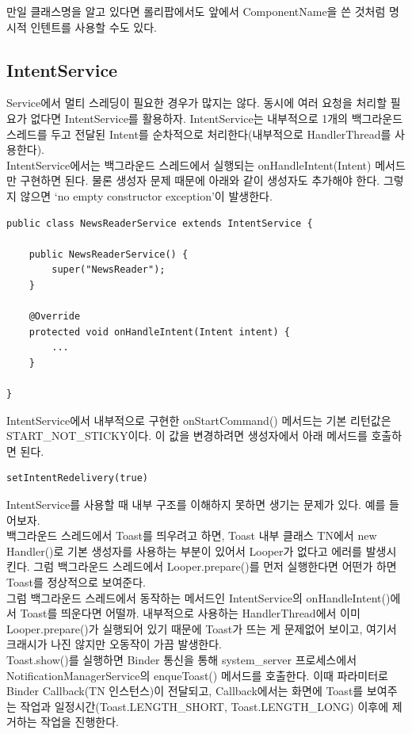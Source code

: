 만일 클래스명을 알고 있다면 롤리팝에서도 앞에서 ComponentName을 쓴 것처럼 명시적 인텐트를 사용할 수도 있다.

\subsection{IntentService}
Service에서 멀티 스레딩이 필요한 경우가 많지는 않다. 동시에 여러 요청을 처리할 필요가 없다면 IntentService를 활용하자.
IntentService는 내부적으로 1개의 백그라운드 스레드를 두고 전달된 Intent를 순차적으로 처리한다(내부적으로 HandlerThread를 사용한다).\\

IntentService에서는 백그라운드 스레드에서 실행되는 onHandleIntent(Intent) 메서드만 구현하면 된다.
물론 생성자 문제 때문에 아래와 같이 생성자도 추가해야 한다. 그렇지 않으면 `no empty constructor exception'이 발생한다. 
\begin{lstlisting}[frame=single]
public class NewsReaderService extends IntentService {

	public NewsReaderService() {
		super("NewsReader");
	}

	@Override
	protected void onHandleIntent(Intent intent) {
		...
	}
	
}	
\end{lstlisting}
IntentService에서 내부적으로 구현한 onStartCommand() 메서드는 기본 리턴값은 START\_NOT\_\-STICKY이다. 이 값을 변경하려면 생성자에서 아래 메서드를 호출하면 된다.
\begin{lstlisting}[frame=single]
setIntentRedelivery(true)
\end{lstlisting}

IntentService를 사용할 때 내부 구조를 이해하지 못하면 생기는 문제가 있다. 
예를 들어보자.\\

백그라운드 스레드에서 Toast를 띄우려고 하면, Toast 내부 클래스 TN에서 new Handler()로 기본 생성자를 사용하는 부분이 있어서 Looper가 없다고 에러를 발생시킨다. 그럼 백그라운드 스레드에서 Looper.prepare()를 먼저 실행한다면 어떤가 하면 Toast를 정상적으로 보여준다.\\

그럼 백그라운드 스레드에서 동작하는 메서드인 IntentService의 onHandleIntent()에서 Toast를 띄운다면 어떨까. 
내부적으로 사용하는 HandlerThread에서 이미 Looper.prepare()가 실행되어 있기 때문에 Toast가 뜨는 게 문제없어 보이고, 여기서 크래시가 나진 않지만 오동작이 가끔 발생한다.\\

Toast.show()를 실행하면 Binder 통신을 통해 system\_server 프로세스에서 NotificationManagerService의 enqueToast() 메서드를 호출한다. 이때 파라미터로 Binder Callback(TN 인스턴스)이 전달되고, Callback에서는 화면에 Toast를 보여주는 작업과 일정시간(Toast.LENGTH\_SHORT, Toast.LENGTH\_LONG) 이후에 제거하는 작업을 진행한다.\\

